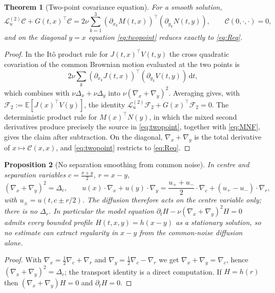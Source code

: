 \documentclass[11pt,reqno]{amsart}
\newcommand{\E}{\mathbb{E}}
\newcommand{\dd}{\,\mathrm{d}}
\newtheorem{theorem}{Theorem}[section]
\newtheorem{proposition}[theorem]{Proposition}
\theoremstyle{definition}
\begin{document}
\begin{theorem}[Two-point covariance equation]\label{thm:twopoint}
For a smooth solution,
\begin{equation}\label{eq:twopoint}
  \mathcal L_u^{(2)}\mathcal C+G(t,x)^\top\mathcal C
  =2\nu\sum_{k=1}^3(\partial_{x_k}M(t,x))^\top(\partial_{y_k}N(t,y)),\qquad
  \mathcal C(0,\cdot,\cdot)=0,
\end{equation}
and on the diagonal $y=x$ equation \eqref{eq:twopoint} reduces exactly to \eqref{eq:Req}.
\end{theorem}

\begin{proof}
In the It\^o product rule for $J(t,x)^\top V(t,y)$ the cross quadratic covariation of the
common Brownian motion evaluated at the two points is
\[
  2\nu\sum_k(\partial_{x_k}J(t,x))^\top(\partial_{y_k}V(t,y))\dd t ,
\]
which combines with $\nu\Delta_x+\nu\Delta_y$ into $\nu(\nabla_x+\nabla_y)^2$. Averaging
gives, with $\mathcal F_2:=\E[J(x)^\top V(y)]$, the identity
$\mathcal L_u^{(2)}\mathcal F_2+G(x)^\top\mathcal F_2=0$. The deterministic product rule for
$M(x)^\top N(y)$, in which the mixed second derivatives produce precisely the source in
\eqref{eq:twopoint}, together with \eqref{eq:MNF}, gives the claim after subtraction. On
the diagonal, $\nabla_x+\nabla_y$ is the total derivative of $x\mapsto\mathcal C(x,x)$, and
\eqref{eq:twopoint} restricts to \eqref{eq:Req}.
\end{proof}

\begin{proposition}[No separation smoothing from common noise]\label{prop:degeneracy}
In centre and separation variables $c=\tfrac{x+y}{2}$, $r=x-y$,
\[
  (\nabla_x+\nabla_y)^2=\Delta_c,\qquad
  u(x)\cdot\nabla_x+u(y)\cdot\nabla_y
  =\frac{u_++u_-}{2}\cdot\nabla_c+(u_+-u_-)\cdot\nabla_r,
\]
with $u_\pm=u(t,c\pm r/2)$. The diffusion therefore acts on the centre variable only;
there is no $\Delta_r$. In particular the model equation
$\partial_tH-\nu(\nabla_x+\nabla_y)^2H=0$ admits every bounded profile
$H(t,x,y)=h(x-y)$ as a stationary solution, so no estimate can extract regularity in
$x-y$ from the common-noise diffusion alone.
\end{proposition}

\begin{proof}
With $\nabla_x=\tfrac12\nabla_c+\nabla_r$ and $\nabla_y=\tfrac12\nabla_c-\nabla_r$ we get
$\nabla_x+\nabla_y=\nabla_c$, hence $(\nabla_x+\nabla_y)^2=\Delta_c$; the transport
identity is a direct computation. If $H=h(r)$ then $(\nabla_x+\nabla_y)H=0$ and
$\partial_tH=0$.
\end{proof}
\end{document}
